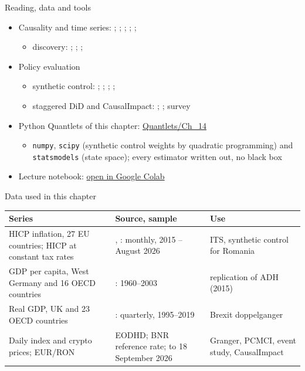 \begin{frame}{Reading, data and tools}
\itemsize{\small}
\begin{itemize}
    \item Causality and time series: ; ; ; ; ; 
    \begin{itemize}
        \item discovery: ; ; ; 
    \end{itemize}
    \item Policy evaluation
    \begin{itemize}
        \item synthetic control: ; ; ; ; 
        \item staggered DiD and CausalImpact: ; ; survey 
    \end{itemize}
    \item Python Quantlets of this chapter: \href{https://github.com/danpele/Advanced-Time-Series/tree/main/Quantlets/Ch_14}{Quantlets/Ch\_14}
    \begin{itemize}
        \item \texttt{numpy}, \texttt{scipy} (synthetic control weights by quadratic programming) and \texttt{statsmodels} (state space); every estimator written out, no black box
    \end{itemize}
    \item Lecture notebook: \href{\colaburl{notebooks/EN/chapter14_lecture_notebook.ipynb}}{open in Google Colab}
\end{itemize}
\end{frame}

\begin{frame}{Data used in this chapter}
\itemsize{\footnotesize}
\begin{center}
\scriptsize
\begin{tabular}{>{\raggedright\arraybackslash}p{3.3cm}>{\raggedright\arraybackslash}p{5.6cm}>{\raggedright\arraybackslash}p{3.4cm}}
\toprule
\textbf{Series} & \textbf{Source, sample} & \textbf{Use} \\
\midrule
HICP inflation, 27 EU countries; HICP at constant tax rates & , : monthly, 2015 -- August 2026 & ITS, synthetic control for Romania \\
GDP per capita, West Germany and 16 OECD countries & : 1960--2003 & replication of ADH (2015) \\
Real GDP, UK and 23 OECD countries & : quarterly, 1995--2019 & Brexit doppelganger \\
Daily index and crypto prices; EUR/RON & EODHD; BNR reference rate; to 18 September 2026 & Granger, PCMCI, event study, CausalImpact \\
\bottomrule
\end{tabular}
\end{center}
\end{frame}

